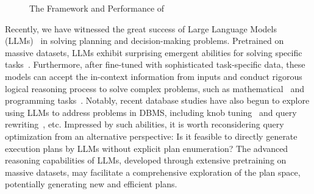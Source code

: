 \begin{figure}
    \centering
    \begin{subfigure}[An Overview of \LLMQO]{%
        \texttt{[image: figures/intro\_dsb/intro\_dsb-figure1.pdf]}
  \label{fig:intro:overview:plan}
     }\end{subfigure}
     \vspace{-1ex}
    \begin{subfigure}[Execution Time Comparsion with Traditional Optimizers on \dsb]{%
        \texttt{[image: figures/intro\_dsb/intro\_dsb-figure0.pdf]}
  \label{fig:intro:overview:performance}
     }\end{subfigure}
    \vspace{1ex}
    \caption{The Framework and Performance of \LLMQO}
    \label{fig:intro_overview}
\end{figure}
Recently, we have witnessed the great success of Large Language Models (LLMs)~\cite{DBLP:journals/pvldb/LaoWLWZCCTW24, zhao2024surveylargelanguagemodels} in solving planning and decision-making problems. Pretrained on massive datasets, LLMs exhibit surprising emergent abilities for solving specific tasks~\cite{wei2022emergent}. Furthermore, after fine-tuned with sophisticated task-specific data, these models can accept the in-context information from inputs and conduct rigorous logical reasoning process to solve complex problems, such as mathematical~\cite{openai2024openaio1card} and programming tasks~\cite{jiang2024surveylargelanguagemodels}. Notably, recent database studies have also begun to explore using LLMs to address  problems in DBMS, including knob tuning~\cite{DBLP:journals/pvldb/LaoWLWZCCTW24} and query rewriting~\cite{DBLP:journals/pvldb/AroraYENHTR23, DBLP:journals/corr/abs-2312-17449}, etc.
Impressed by such abilities, it is worth reconsidering query optimization from an alternative perspective: Is it feasible to directly generate execution plans by LLMs without explicit plan enumeration?
The advanced reasoning capabilities of LLMs, developed through extensive pretraining on massive datasets, may facilitate a comprehensive exploration of the plan space, potentially generating new and efficient plans. 


